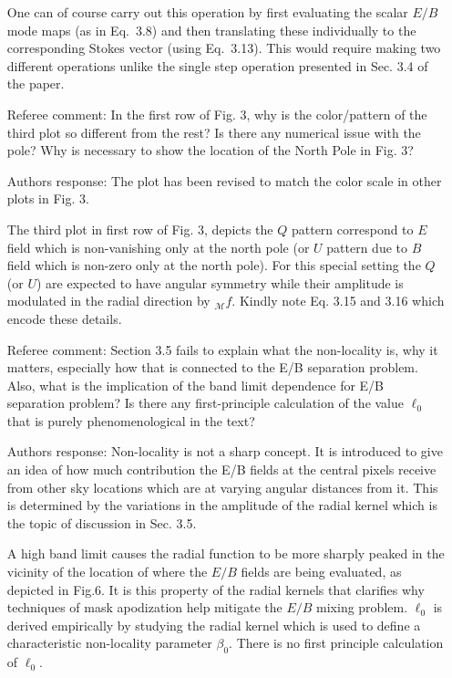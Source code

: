 \documentclass[12pt]{article}
\begin{document}
\begin{itemize}
One can of course carry out this operation by first evaluating the scalar $E/B$ mode maps (as in Eq.~3.8) and then translating these individually to the corresponding Stokes vector (using Eq.~3.13). This would require making two different operations unlike the single step operation presented in Sec. 3.4 of the paper.

\item[{Referee comment: }] In the first row of Fig. 3, why is the color/pattern of the third plot so different from the rest? Is there any numerical issue with the pole? Why is necessary to show the location of the North Pole in Fig. 3?

\item[{Authors response: }] The plot has been revised to match the color scale in other plots in Fig. 3. 

The third plot in first row of Fig. 3, depicts the $Q$ pattern correspond to $E$ field which is non-vanishing only at the north pole (or $U$ pattern due to $B$ field which is non-zero only at the north pole). For this special setting the $Q$(or $U$) are expected to have angular symmetry while their amplitude is modulated in the radial direction by ${}_{\mathcal{M}}f$. Kindly note Eq. 3.15 and 3.16 which encode these details. 

\item[{Referee comment: }] Section 3.5 fails to explain what the non-locality is, why it matters, especially how that is connected to the E/B separation problem. Also, what is the implication of the band limit dependence for E/B separation problem? Is there any first-principle calculation of the value $\ell_0$ that is purely phenomenological in the text?

\item[{Authors response: }] Non-locality is not a sharp concept. It is introduced to give an idea of how much contribution the E/B fields at the central pixels receive from other sky locations which are at varying angular distances from it.  This is determined by the variations in the amplitude of the radial kernel which is the topic of discussion in Sec. 3.5.

A high band limit causes the radial function to be more sharply peaked in the vicinity of the location of where the $E/B$ fields are being evaluated, as depicted in Fig.6. It is this property of the radial kernels that  clarifies why techniques of mask apodization help mitigate the $E/B$ mixing problem. 
 \hspace{0.02cm} $\ell_0$ is derived empirically by studying the radial kernel which is used to define a characteristic non-locality parameter $\beta_0$. There is no first principle calculation of $\ell_0$.
 

\end{itemize}
\end{document}
